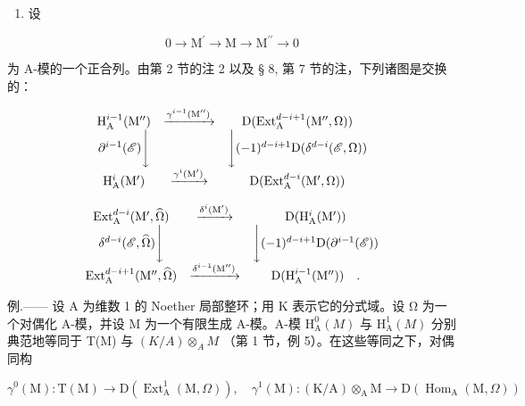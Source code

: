 \begin{enumerate}
\def\labelenumi{\arabic{enumi})}
\setcounter{enumi}{2}
\tightlist
\item
  设
\end{enumerate}

\[
0 \rightarrow \mathrm{M} ^ {\prime} \rightarrow \mathrm{M} \rightarrow \mathrm{M} ^ {\prime \prime} \rightarrow 0\tag{ℰ}
\]

为 A-模的一个正合列。由第 2 节的注 2 以及 § 8, 第 7 节的注，下列诸图是交换的：

\[
\begin{array}{c c c} \mathrm{H} _ {\mathrm{A}} ^ {i - 1} (\mathrm{M} ^ {\prime \prime}) & \xrightarrow {\gamma^ {i - 1} (\mathrm{M} ^ {\prime \prime})} & \mathrm{D} (\mathrm{Ext} _ {\mathrm{A}} ^ {d - i + 1} (\mathrm{M} ^ {\prime \prime}, \Omega)) \\ \partial^ {i - 1} (\mathscr {E}) \Bigg \downarrow & & \Bigg \downarrow (- 1) ^ {d - i + 1} \mathrm{D} (\delta^ {d - i} (\mathscr {E}, \Omega)) \\ \mathrm{H} _ {\mathrm{A}} ^ {i} (\mathrm{M} ^ {\prime}) & \xrightarrow {\gamma^ {i} (\mathrm{M} ^ {\prime})} & \mathrm{D} (\mathrm{Ext} _ {\mathrm{A}} ^ {d - i} (\mathrm{M} ^ {\prime}, \Omega)) \end{array}
\]

\[
\begin{array}{c c c} \operatorname{Ext} _ {\mathrm{A}} ^ {d - i} (\mathrm{M} ^ {\prime}, \widehat {\Omega}) & \xrightarrow {\delta^ {i} (\mathrm{M} ^ {\prime})} & \mathrm{D} (\mathrm{H} _ {\mathrm{A}} ^ {i} (\mathrm{M} ^ {\prime})) \\ \delta^ {d - i} (\mathscr {E}, \widehat {\Omega}) \Bigg \downarrow & & \Bigg \downarrow (- 1) ^ {d - i + 1} \mathrm{D} (\partial^ {i - 1} (\mathscr {E})) \\ \operatorname{Ext} _ {\mathrm{A}} ^ {d - i + 1} (\mathrm{M} ^ {\prime \prime}, \widehat {\Omega}) & \xrightarrow {\delta^ {i - 1} (\mathrm{M} ^ {\prime \prime})} & \mathrm{D} (\mathrm{H} _ {\mathrm{A}} ^ {i - 1} (\mathrm{M} ^ {\prime \prime})) \quad . \end{array}
\]

例.—— 设 A 为维数 1 的 Noether 局部整环；用 K 表示它的分式域。设 Ω 为一个对偶化 A-模，并设 M 为一个有限生成 A-模。A-模 \(\mathrm{H}_{\mathrm{A}}^{0}(M)\) 与 \(\mathrm{H}_{\mathrm{A}}^{1}(M)\) 分别典范地等同于 T(M) 与 \((K/A) \otimes_{A} M\) （第 1 节，例 5）。在这些等同之下，对偶同构

\[
\gamma^ {0} (\mathrm{M}): \mathrm{T} (\mathrm{M}) \longrightarrow \mathrm{D} \left(\operatorname{Ext} _ {\mathrm{A}} ^ {1} (\mathrm{M}, \Omega)\right), \quad \gamma^ {1} (\mathrm{M}): (\mathrm{K} / \mathrm{A}) \otimes_ {\mathrm{A}} \mathrm{M} \longrightarrow \mathrm{D} \left(\operatorname{Hom} _ {\mathrm{A}} (\mathrm{M}, \Omega)\right)
\]

